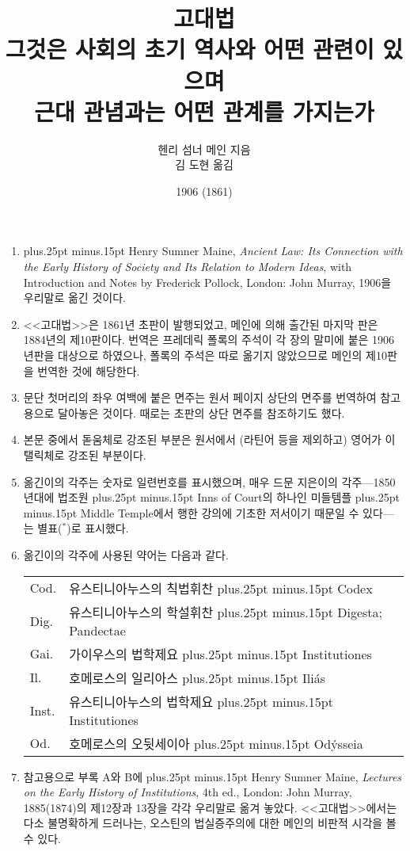 \documentclass[b5paper]{book}
\def\latinmarks{\hangulpunctuations=0
    \aftergroup\hangulpunctuations\aftergroup1\aftergroup\relax }
\def\latin#1{\ifnum\lastskip=0 \penalty50 \hskip0pt plus.25pt minus.15pt\fi
  \begingroup\latinmarks\footnotesize #1\endgroup}
\def\paren#1{\begingroup\small(#1)\endgroup}
\begin{document}
\title{고대법\\
\large 그것은 사회의 초기 역사와 어떤 관련이 있으며\\
근대 관념과는 어떤 관계를 가지는가}
\author{헨리 섬너 메인 지음\\
김 도현 옮김}
\date{1906 (1861)}

\frontmatter

\maketitle

\null\vfill
\thispagestyle{empty}
\begin{enumerate}
    \small
  \item \latin{\small
    Henry Sumner Maine, \textit{Ancient Law: Its Connection with
    the Early History of Society and Its Relation to Modern Ideas}, with
    Introduction and Notes by Frederick Pollock, London: John Murray,
    1906}을 우리말로 옮긴 것이다.
  \item <<고대법>>은 1861년 초판이 발행되었고,
    메인에 의해 출간된 마지막 판은 1884년의 제10판이다.
    번역은 프레데릭 폴록의 주석이
    각 장의 말미에 붙은 1906년판을 대상으로 하였으나,
    폴록의 주석은 따로 옮기지 않았으므로
    메인의 제10판을 번역한 것에 해당한다.
  \item 문단 첫머리의 좌우 여백에 붙은 면주는 원서 페이지 상단의 면주를
    번역하여
    참고용으로
    달아놓은 것이다.
    때로는 초판의 상단 면주를 참조하기도 했다.
  \item 본문 중에서 돋움체로 강조된 부분은
    원서에서 \paren{라틴어 등을 제외하고} 영어가
    이탤릭체로 강조된 부분이다.
  \item 옮긴이의 각주는 숫자로 일련번호를 표시했으며,
    매우 드문 지은이의 각주---1850년대에 법조원\latin{Inns of Court}의
    하나인 미들템플\latin{Middle Temple}에서
    행한 강의에 기초한 저서이기 때문일 수 있다---는
    별표($^*$)로 표시했다.
  \item 옮긴이의 각주에 사용된 약어는 다음과 같다.

    \begin{tabular}{l@{ $=$ }l}
      Cod.  & 유스티니아누스의 칙법휘찬\latin{Codex} \\
      Dig.  & 유스티니아누스의 학설휘찬\latin{Digesta; Pandectae} \\
      Gai.  & 가이우스의 법학제요\latin{Institutiones} \\
      Il.   & 호메로스의 일리아스\latin{Iliás} \\
      Inst. & 유스티니아누스의 법학제요\latin{Institutiones} \\
      Od.   & 호메로스의 오뒷세이아\latin{Odýsseia} \\
    \end{tabular}
  \item 참고용으로
    부록 A와 B에 \latin{Henry Sumner Maine,
    \textit{Lectures on the Early History of Institutions}, 4th ed.,
    London: John Murray, 1885(1874)}의 제12장과 13장을 각각 우리말로
    옮겨 놓았다. <<고대법>>에서는 다소 불명확하게 드러나는,
    오스틴의 법실증주의에 대한 메인의 비판적 시각을 볼 수 있다.
\end{enumerate}
\end{document}
